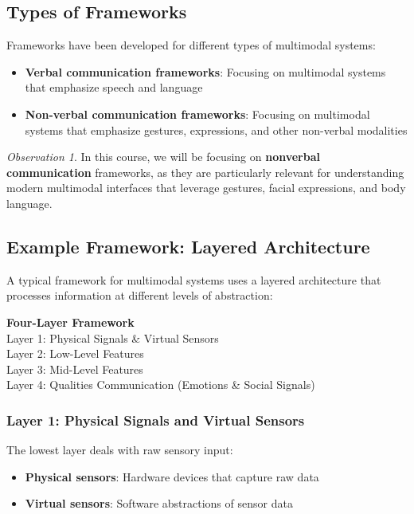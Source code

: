\documentclass[11pt,a4paper]{article}
\theoremstyle{definition}
\theoremstyle{plain}
\theoremstyle{remark}
\newtheorem*{observation}{Observation}
\begin{document}
\subsection{Types of Frameworks}

Frameworks have been developed for different types of multimodal systems:

\begin{itemize}
    \item \textbf{Verbal communication frameworks}: Focusing on multimodal systems that emphasize speech and language
    \item \textbf{Non-verbal communication frameworks}: Focusing on multimodal systems that emphasize gestures, expressions, and other non-verbal modalities
\end{itemize}

\begin{observation}
In this course, we will be focusing on \textbf{nonverbal communication} frameworks, as they are particularly relevant for understanding modern multimodal interfaces that leverage gestures, facial expressions, and body language.
\end{observation}

\subsection{Example Framework: Layered Architecture}

A typical framework for multimodal systems uses a layered architecture that processes information at different levels of abstraction:

\begin{center}
\colorbox{teal!15}{\parbox{0.9\textwidth}{
\centering
\textbf{Four-Layer Framework}\\[0.2cm]
Layer 1: Physical Signals \& Virtual Sensors\\
Layer 2: Low-Level Features\\
Layer 3: Mid-Level Features\\
Layer 4: Qualities Communication (Emotions \& Social Signals)
}}
\end{center}

\subsubsection{Layer 1: Physical Signals and Virtual Sensors}

The lowest layer deals with raw sensory input:

\begin{itemize}
    \item \textbf{Physical sensors}: Hardware devices that capture raw data
    \item \textbf{Virtual sensors}: Software abstractions of sensor data
\end{itemize}
\end{document}
